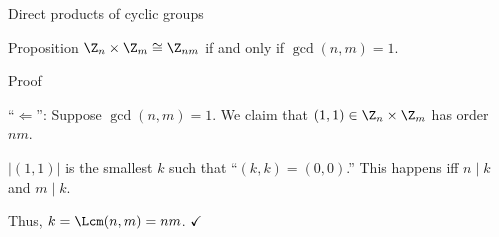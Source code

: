 \documentclass[8pt, handout]{beamer}
\newcommand{\Pause}{}
\begin{document}
\begin{frame}{Direct products of cyclic groups} \smallskip

  \begin{block}{Proposition}
    $\Z_n\times\Z_m\cong\Z_{nm}$ if and only if $\gcd(n,m)=1$.
  \end{block}
  
  \smallskip
  
  \begin{exampleblock}{Proof}\Pause
    
    ``$\Leftarrow$'': Suppose $\gcd(n,m)=1$. \Pause We claim that
    $(1,1)\in\Z_n\times\Z_m$ has order $nm$. \medskip\Pause
    
    $|(1,1)|$ is the smallest $k$ such that
    ``$(k,k)=(0,0)$.'' \Pause This happens iff $n\mid k$ and $m\mid
    k$. \medskip\Pause
    
    Thus, $k=\Lcm(n,m)\Pause=nm$. $\hfill\checkmark$
    
    \Pause
    

\end{exampleblock}
\end{frame}
\end{document}
